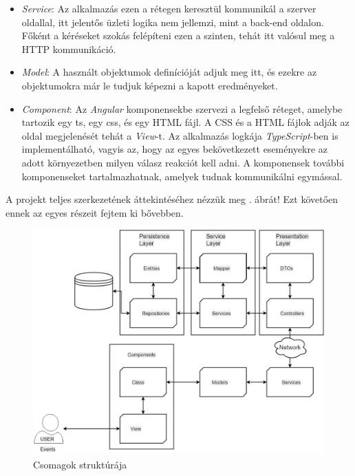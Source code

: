 \begin{itemize}
    \item \textit{Service}: Az alkalmazás ezen a rétegen keresztül kommunikál a szerver oldallal, itt jelentős üzleti logika nem jellemzi, mint a back-end oldalon. Főként a kéréseket szokás felépíteni ezen a szinten, tehát itt valósul meg a HTTP kommunikáció.
    \item \textit{Model}: A használt objektumok definícióját adjuk meg itt, és ezekre az objektumokra már le tudjuk képezni a kapott eredményeket.
    \item \textit{Component}:  Az \textit{Angular} komponensekbe szervezi a legfelső réteget, amelybe tartozik egy ts, egy css, és egy HTML fájl. A CSS és a HTML fájlok adják az oldal megjelenését tehát a \textit{View}-t. Az alkalmazás logkája \textit{TypeScript}-ben is implementálható, vagyis az, hogy az egyes bekövetkezett eseményekre az adott környezetben milyen válasz reakciót kell adni. A komponensek további komponenseket tartalmazhatnak, amelyek tudnak kommunikálni egymással.
\end{itemize}


A projekt teljes szerkezetének áttekintéséhez nézzük meg . ábrát! Ezt követően ennek az egyes részeit fejtem ki bővebben.

\begin{figure}[h!]
\centering
\includegraphics[scale=0.4]{kepek/mvc_arch.jpg}
\caption{Csomagok struktúrája}
\label{fig:mvc}
\end{figure}

